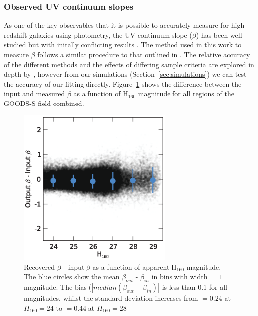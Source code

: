 \subsubsection{Observed UV continuum slopes}\label{app:beta}
As one of the key observables that it is possible to accurately measure for high-redshift galaxies using photometry, the UV continuum slope ($\beta$) has been well studied but with initally conflicting results \citep{Dunlop:2011jl,Wilkins:2011fs,2012ApJ...754...83B,Finkelstein:2012hr,2013MNRAS.429.2456R,Bouwens:2013vf}. The method used in this work to measure $\beta$ follows a similar procedure to that outlined in \citet{Finkelstein:2012hr}. The relative accuracy of the different methods and the effects of differing sample criteria are explored in depth by \citet{2013MNRAS.429.2456R}, however from our simulations (Section~\ref{sec:simulations}) we can test the accuracy of our fitting directly. Figure~\ref{fig:betacomparison} shows the difference between the input and measured $\beta$ as a function of H$_{160}$ magnitude for all regions of the GOODS-S field combined.  

\begin{figure}
\centering
\includegraphics[width=75mm]{plots/figB1.eps}
\caption{Recovered $\beta$ - input $\beta$ as a function of apparent H$_{160}$ magnitude. The blue circles show the mean $\beta_{out}$ - $\beta_{in}$ in bins with width $=1$ magnitude. The bias ($\left | median (\beta_{out}-\beta_{in}) \right |$ is less than 0.1 for all magnitudes, whilst the standard deviation increases from $= 0.24$ at $H_{160} = 24$ to $= 0.44$ at $H_{160} = 28$}
\label{fig:betacomparison}
\end{figure}


